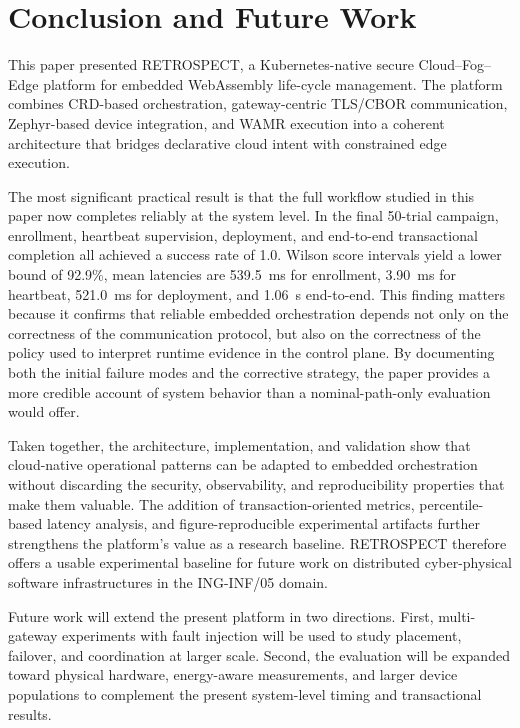 \section{Conclusion and Future Work}

This paper presented RETROSPECT, a Kubernetes-native secure Cloud--Fog--Edge platform for embedded WebAssembly life-cycle management. The platform combines CRD-based orchestration, gateway-centric TLS/CBOR communication, Zephyr-based device integration, and WAMR execution into a coherent architecture that bridges declarative cloud intent with constrained edge execution.

The most significant practical result is that the full workflow studied in this paper now completes reliably at the system level. In the final 50-trial campaign, enrollment, heartbeat supervision, deployment, and end-to-end transactional completion all achieved a success rate of 1.0. Wilson score intervals yield a lower bound of 92.9\%, mean latencies are 539.5~ms for enrollment, 3.90~ms for heartbeat, 521.0~ms for deployment, and 1.06~s end-to-end. This finding matters because it confirms that reliable embedded orchestration depends not only on the correctness of the communication protocol, but also on the correctness of the policy used to interpret runtime evidence in the control plane. By documenting both the initial failure modes and the corrective strategy, the paper provides a more credible account of system behavior than a nominal-path-only evaluation would offer.

Taken together, the architecture, implementation, and validation show that cloud-native operational patterns can be adapted to embedded orchestration without discarding the security, observability, and reproducibility properties that make them valuable. The addition of transaction-oriented metrics, percentile-based latency analysis, and figure-reproducible experimental artifacts further strengthens the platform's value as a research baseline. RETROSPECT therefore offers a usable experimental baseline for future work on distributed cyber-physical software infrastructures in the ING-INF/05 domain.

Future work will extend the present platform in two directions. First, multi-gateway experiments with fault injection will be used to study placement, failover, and coordination at larger scale. Second, the evaluation will be expanded toward physical hardware, energy-aware measurements, and larger device populations to complement the present system-level timing and transactional results.
